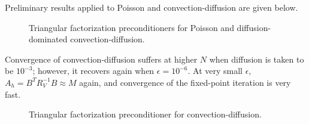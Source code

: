 \documentclass{article}
\begin{document}
Preliminary results applied to Poisson and convection-diffusion are given below.  
\begin{figure}
\centering
{}
\caption{Triangular factorization preconditioners for Poisson and diffusion-dominated convection-diffusion.}
\end{figure}

Convergence of convection-diffusion suffers at higher $N$ when diffusion is taken to be $10^{-3}$; however, it recovers again when $\epsilon = 10^{-6}$.  At very small $\epsilon$, $A_h = B^TR_V^{-1}B \approx M$ again, and convergence of the fixed-point iteration is very fast.  
\begin{figure}
\centering
{}
\caption{Triangular factorization preconditioner for convection-diffusion.}
\end{figure}
\end{document}
